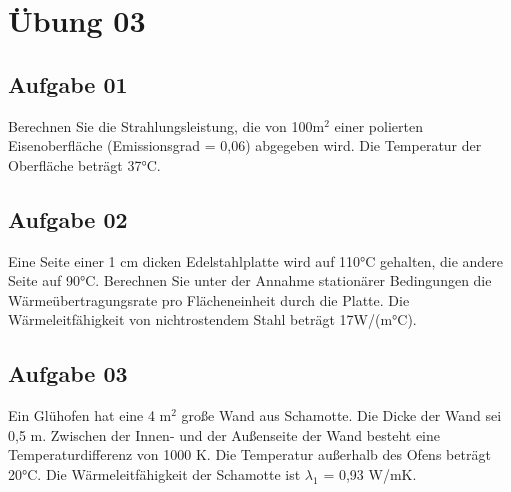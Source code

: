 \documentclass[a4paper,10pt]{article}
\begin{document}
\sidebar
{}
\par \vspace*{5mm}


\section{Übung 03}
\subsection{Aufgabe 01}
Berechnen Sie die Strahlungsleistung, die von 100m$^2$ einer polierten Eisenoberfläche
(Emissionsgrad = 0,06) abgegeben wird. Die Temperatur der Oberfläche beträgt 37°C.
\subsection{Aufgabe 02}
Eine Seite einer 1 cm dicken Edelstahlplatte wird auf 110°C gehalten, die andere Seite
auf 90°C. Berechnen Sie unter der Annahme stationärer Bedingungen die
Wärmeübertragungsrate pro Flächeneinheit durch die Platte. Die Wärmeleitfähigkeit von
nichtrostendem Stahl beträgt 17W/(m°C).
\pagebreak
\subsection{Aufgabe 03}
Ein Glühofen hat eine 4 m$^2$ große Wand aus Schamotte. Die Dicke der Wand sei 0,5 m.
Zwischen der Innen- und der Außenseite der Wand besteht eine Temperaturdifferenz von
1000 K. Die Temperatur außerhalb des Ofens beträgt 20°C. Die Wärmeleitfähigkeit der
Schamotte ist $\lambda_1$ = 0,93 W/mK. 
\end{document}
